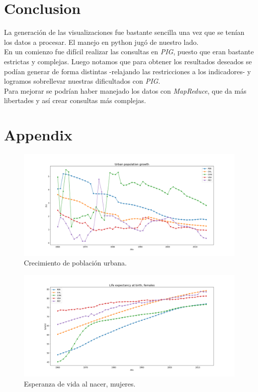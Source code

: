 \documentclass{article}
\begin{document}
\section{Conclusion}

La generación de las visualizaciones fue bastante sencilla una vez que se tenían los datos a procesar. El manejo en python jugó de nuestro lado.\\
En un comienzo fue difícil realizar las consultas en \textit{PIG}, puesto que eran bastante estrictas y complejas. Luego notamos que para obtener los resultados deseados se podían generar de forma distintas -relajando las restricciones a los indicadores- y logramos sobrellevar nuestras dificultados con \textit{PIG}.\\
Para mejorar se podrían haber manejado los datos con \textit{MapReduce}, que da más libertades y así crear consultas más complejas.

\newpage
\section*{Appendix}



\begin{figure}[!h]
	\centering
	\includegraphics[scale=0.38]{images/2.png}
	\caption{Crecimiento de población urbana.}
	\label{fig:1}
\end{figure}

\begin{figure}
	\centering
	\includegraphics[scale=0.38]{images/figure_1.png}
	\caption{Esperanza de vida al nacer, mujeres.}
	\label{fig:2}
\end{figure}
\end{document}
